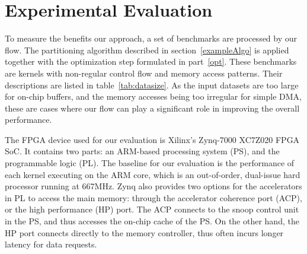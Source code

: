 \documentclass{sig-alternate}
\begin{document}
\begin{algorithm}[t]
\begin{algorithmic}[1]
  
  
  \end{algorithmic}
\end{algorithm}

\section{Experimental Evaluation}
\label{expEval}
To measure the benefits our approach, a set of benchmarks are processed by our flow. The partitioning algorithm described in section~\ref{exampleAlgo} is applied together with the optimization step formulated in part~\ref{opt}. These benchmarks are kernels with non-regular control flow and memory access patterns. Their descriptions are listed in table~\ref{tab:datasize}. 
As the input datasets are too large for on-chip buffers, and the memory accesses
being too irregular for simple DMA, these are cases where our flow can play a significant role
in improving the overall performance.







The FPGA device used for our evaluation is Xilinx's Zynq-7000 XC7Z020 FPGA
SoC. It contains two parts: an ARM-based processing
system (PS), and the programmable logic (PL). 
The baseline for our evaluation is the performance of each kernel executing
on the ARM core, which is an out-of-order, dual-issue hard processor running at 667MHz. Zynq also provides two
options for the accelerators in PL to access the main memory: 
through the accelerator coherence port (ACP), or the high performance (HP) port. 
The ACP connects to the snoop control unit in the PS, and 
thus accesses the on-chip cache of the PS. On the other hand, the HP port connects
directly to the memory controller, thus often incurs longer latency
for data requests.
\end{document}
